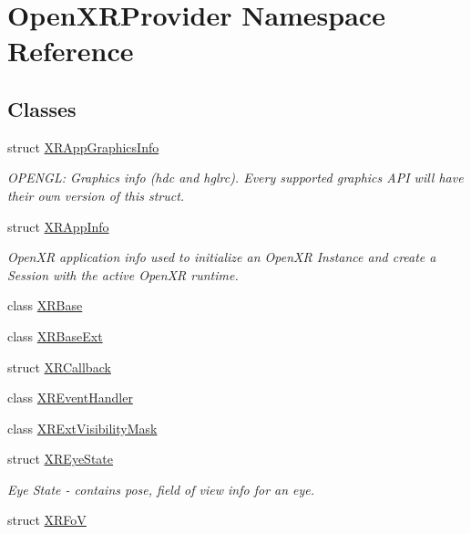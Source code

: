 \hypertarget{namespace_open_x_r_provider}{}\section{Open\+X\+R\+Provider Namespace Reference}
\label{namespace_open_x_r_provider}
\subsection*{Classes}
\begin{DoxyCompactItemize}
\item 
struct \mbox{\hyperlink{struct_open_x_r_provider_1_1_x_r_app_graphics_info}{X\+R\+App\+Graphics\+Info}}
\begin{DoxyCompactList}\small\item\em O\+P\+E\+N\+GL\+: Graphics info (hdc and hglrc). Every supported graphics A\+PI will have their own version of this struct. \end{DoxyCompactList}\item 
struct \mbox{\hyperlink{struct_open_x_r_provider_1_1_x_r_app_info}{X\+R\+App\+Info}}
\begin{DoxyCompactList}\small\item\em Open\+XR application info used to initialize an Open\+XR Instance and create a Session with the active Open\+XR runtime. \end{DoxyCompactList}\item 
class \mbox{\hyperlink{class_open_x_r_provider_1_1_x_r_base}{X\+R\+Base}}
\item 
class \mbox{\hyperlink{class_open_x_r_provider_1_1_x_r_base_ext}{X\+R\+Base\+Ext}}
\item 
struct \mbox{\hyperlink{struct_open_x_r_provider_1_1_x_r_callback}{X\+R\+Callback}}
\item 
class \mbox{\hyperlink{class_open_x_r_provider_1_1_x_r_event_handler}{X\+R\+Event\+Handler}}
\item 
class \mbox{\hyperlink{class_open_x_r_provider_1_1_x_r_ext_visibility_mask}{X\+R\+Ext\+Visibility\+Mask}}
\item 
struct \mbox{\hyperlink{struct_open_x_r_provider_1_1_x_r_eye_state}{X\+R\+Eye\+State}}
\begin{DoxyCompactList}\small\item\em Eye State -\/ contains pose, field of view info for an eye. \end{DoxyCompactList}\item 
struct \mbox{\hyperlink{struct_open_x_r_provider_1_1_x_r_fo_v}{X\+R\+FoV}}

\end{DoxyCompactItemize}
